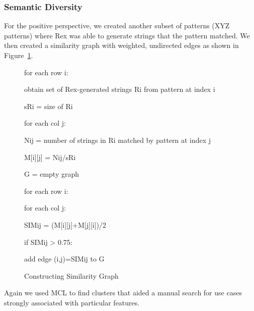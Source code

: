 \subsubsection{Semantic Diversity}
For the positive perspective, we created another subset of patterns (XYZ patterns) where Rex was able to generate strings that the pattern matched.  We then created a similarity graph with weighted, undirected edges as shown in Figure~\ref{fig:similarityConstruction}.

\begin{figure}
\begin{description}
\setlength{\parskip}{0pt} %
\setlength{\itemindent}{0in}
\item for each row i:
\setlength{\itemindent}{0.2in}
\item obtain set of Rex-generated strings Ri from pattern at index i
\item sRi = size of Ri
\item for each col j:
\setlength{\itemindent}{0.4in}
\item Nij = number of strings in Ri matched by pattern at index j
\item M[i][j] = Nij/sRi
\setlength{\itemindent}{0in}
\item G = empty graph
\item for each row i:
\setlength{\itemindent}{0.2in}
\item for each col j:
\setlength{\itemindent}{0.4in}
\item SIMij = (M[i][j]+M[j][i])/2
\item if SIMij > 0.75:
\setlength{\itemindent}{0.6in}
\item add edge (i,j)=SIMij to G
\setlength{\itemindent}{0in}
\setlength{\parskip}{10pt} %
\end{description}
\caption{Constructing Similarity Graph \label{fig:similarityConstruction}}
\end{figure}

Again we used MCL to find clusters that aided a manual search for use cases strongly associated with particular features.



%

%









